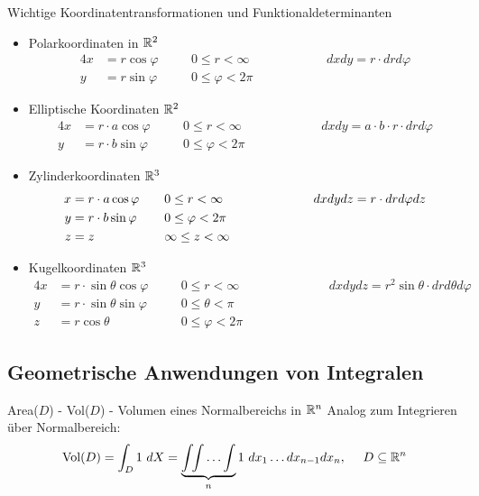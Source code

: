 \begin{Rechenregeln}{Wichtige Koordinatentransformationen und Funktionaldeterminanten}{}
    \begin{itemize}
       \item Polarkoordinaten in $\mathbb{R}^2$ \begin{alignat*}{4}
            x &= r \cos \varphi\quad &&0 \leq r < \infty\quad &~~~~~~~~~~~&&dxdy = r \cdot drd\varphi\\
            y &= r \sin \varphi\quad &&0 \leq \varphi < 2\pi\quad
        \end{alignat*}
        \item Elliptische Koordinaten $\mathbb{R}^2$ \begin{alignat*}{4}
            x &= r \cdot  a \cos \varphi\quad &&0 \leq r < \infty\quad &~~~~~~~~~~~~&&dxdy = a \cdot b \cdot  r \cdot drd\varphi\\
            y &= r \cdot b \sin \varphi\quad &&0 \leq \varphi < 2\pi\quad
        \end{alignat*}
        \item Zylinderkoordinaten $\mathbb{R}^3$ \begin{alignat*}{4}
            x &= r \cdot  a \cos \varphi\quad &&0 \leq r < \infty\quad &~~~~~~~~~~~&&dxdydz = r \cdot drd\varphi dz\\
            y &= r \cdot b \sin \varphi\quad &&0 \leq \varphi < 2\pi\quad\\
            z &= z\quad &&\-\infty \leq z < \infty\quad
        \end{alignat*}
        \item Kugelkoordinaten $\mathbb{R}^3$ \begin{alignat*}{4}
            x &= r \cdot \sin \theta \cos \varphi \quad &&0 \leq r < \infty\quad &~~~~~~~~~~~&&dxdydz = r^2 \sin \theta \cdot drd\theta d\varphi\\
            y &= r \cdot \sin \theta \sin \varphi \quad && 0 \leq \theta < \pi\quad\\
            z &= r \cos \theta \quad &&0 \leq \varphi < 2\pi\quad\quad
        \end{alignat*}
   \end{itemize}
\end{Rechenregeln}

\subsection{Geometrische Anwendungen von Integralen}

\begin{Rezept}{Area($D$) - Vol($D$) - Volumen eines Normalbereichs in $\mathbb{R}^n$}{}
Analog zum Integrieren über Normalbereich:
\[ \text{Vol}(D) = \int_D 1 ~ dX = \underbrace{\int \!\! \int \ldots \int}_{n} 1 ~ dx_1 \ldots dx_{n-1} dx_n,  ~~~~ D \subseteq \mathbb{R}^n\]
\end{Rezept}

